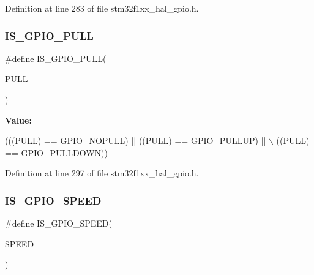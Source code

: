 Definition at line 283 of file stm32f1xx\+\_\+hal\+\_\+gpio.\+h.

\mbox{\label{group___g_p_i_o___private___macros_ga1cb9706d23fb79584aae41e5e503f3cd}} 
\subsubsection{\texorpdfstring{I\+S\+\_\+\+G\+P\+I\+O\+\_\+\+P\+U\+LL}{IS\_GPIO\_PULL}}
{\footnotesize\ttfamily \#define I\+S\+\_\+\+G\+P\+I\+O\+\_\+\+P\+U\+LL(\begin{DoxyParamCaption}\item[{}]{P\+U\+LL }\end{DoxyParamCaption})}

{\bfseries Value\+:}
\begin{DoxyCode}
(((PULL) == \hyperlink{group___g_p_i_o__pull__define_ga5c2862579882c1cc64e36d38fbd07a4c}{GPIO\_NOPULL}) || ((PULL) == \hyperlink{group___g_p_i_o__pull__define_gae689bc8f5c42d6df7bd54a8dd372e072}{GPIO\_PULLUP}) || \(\backslash\)
                            ((PULL) == \hyperlink{group___g_p_i_o__pull__define_ga75d958d0410c36da7f27d1f4f5c36c14}{GPIO\_PULLDOWN}))
\end{DoxyCode}


Definition at line 297 of file stm32f1xx\+\_\+hal\+\_\+gpio.\+h.

\mbox{\label{group___g_p_i_o___private___macros_ga888e1f951df2fe9dbf827528051a3a56}} 
\subsubsection{\texorpdfstring{I\+S\+\_\+\+G\+P\+I\+O\+\_\+\+S\+P\+E\+ED}{IS\_GPIO\_SPEED}}
{\footnotesize\ttfamily \#define I\+S\+\_\+\+G\+P\+I\+O\+\_\+\+S\+P\+E\+ED(\begin{DoxyParamCaption}\item[{}]{S\+P\+E\+ED }\end{DoxyParamCaption})}

